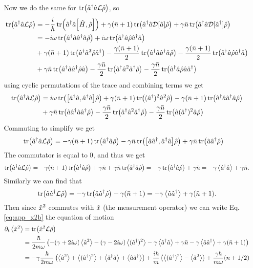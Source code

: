 Now we do the same for $\tr(\hat{a}^{\dagger}\hat{a}\mathcal{L}\hat{\rho})$, so
\begin{align}
    \tr(\ad\a\mathcal{L}\dmatrix) &= -\frac{i}{\hbar}\tr(\ad\a\comm{\hamiltonian}{\dmatrix}) + \gamma(\nbar + 1)\tr(\ad\a\mathcal{D}[\a]\dmatrix) + \gamma \nbar \tr(\ad\a\mathcal{D}[\ad]\dmatrix)\\
    &= -i\omega \tr(\ad\a\ad\a\dmatrix) + i\omega \tr(\ad\a\dmatrix\ad\a)\\
    &+ \gamma(\nbar + 1)\tr(\ad\a^2\dmatrix\ad) - \frac{\gamma(\nbar + 1)}{2}\tr(\ad\a\ad\a\dmatrix) - \frac{\gamma(\nbar + 1)}{2}\tr(\ad\a\dmatrix\ad\a)\\
    &+ \gamma\nbar\tr(\ad\a\ad\dmatrix\a) - \frac{\gamma\nbar}{2}\tr(\ad\a^2\ad\dmatrix) - \frac{\gamma\nbar}{2}\tr(\ad\a\dmatrix\a\ad)
\end{align}
using cyclic permutations of the trace and combining terms we get
\begin{align}
    \tr(\ad\a\mathcal{L}\dmatrix) &= i\omega\tr(\comm{\ad\a}{\ad\a}\dmatrix) + \gamma(\nbar + 1) \tr((\ad)^2\a^2 \dmatrix) -\gamma (\nbar + 1)\tr(\ad\a\ad\a\dmatrix)\\
    &+ \gamma\nbar\tr(\a\ad\a\ad\dmatrix) - \frac{\gamma \nbar}{2} \tr(\ad\a^2\ad\dmatrix) - \frac{\gamma \nbar}{2} \tr(\a (\ad)^2 \a \dmatrix)
\end{align}
Commuting to simplify we get
\begin{align}
    \tr(\ad\a\mathcal{L}\dmatrix) &= - \gamma(\nbar + 1) \tr(\ad\a\dmatrix) - \gamma \nbar \tr(\comm{\a\ad}{\ad\a} \dmatrix) + \gamma \nbar \tr(\a\ad\dmatrix)
\end{align}
The commutator is equal to 0, and thus we get
\begin{equation}
    \tr(\hat{a}^{\dagger}\hat{a}\mathcal{L}\hat{\rho}) = - \gamma(\bar{n} + 1) \tr(\hat{a}^{\dagger}\hat{a}\hat{\rho}) +\gamma \bar{n} + \gamma\bar{n} \tr(\hat{a}^{\dagger}\hat{a}\hat{\rho}) = -\gamma \tr(\hat{a}^{\dagger}\hat{a}\hat{\rho}) + \gamma\bar{n} = -\gamma \expval{\hat{a}^{\dagger}\hat{a}} + \gamma\bar{n}.
\end{equation}
Similarly we can find that
\begin{equation}
    \tr(\hat{a}\hat{a}^{\dagger}\mathcal{L}\hat{\rho}) = -\gamma \tr(\hat{a}\hat{a}^{\dagger}\hat{\rho}) + \gamma(\bar{n} + 1) = -\gamma \expval{\hat{a}\hat{a}^{\dagger}} + \gamma(\bar{n} + 1).
\end{equation}
Then since $\hat{x}^2$ commutes with $\hat{x}$ (the measurement operator) we can write Eq. \eqref{eq:app_x2b} the equation of motion
\begin{align}
    \partial_t\expval{\hat{x}^2} &= \tr(\hat{x}^2\mathcal{L}\hat{\rho}) \\
    &= \frac{\hbar}{2 m \omega} \left( -(\gamma + 2 i \omega)\expval{\hat{a}^2} -(\gamma - 2 i \omega)\expval{(\hat{a}^{\dagger})^2} - \gamma\expval{\hat{a}^{\dagger}\hat{a}} + \gamma\bar{n} - \gamma\expval{\hat{a}\hat{a}^{\dagger}} + \gamma(\bar{n}+1) \right)\\
    &= -\gamma \frac{\hbar}{2 m \omega} \left( \expval{\hat{a}^2} + \expval{(\hat{a}^{\dagger})^2} + \expval{\hat{a}^{\dagger}\hat{a}} + \expval{\hat{a}\hat{a}^{\dagger}} \right) + \frac{i\hbar}{m}\left( \expval{(\hat{a}^{\dagger})^2} - \expval{\hat{a}^2} \right) + \frac{\gamma \hbar}{m\omega}(\bar{n} + 1/2)
\end{align}
